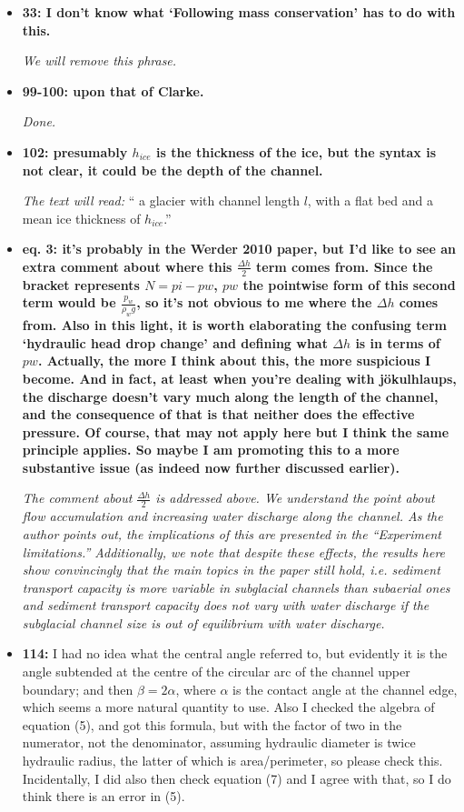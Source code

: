 \documentclass[11pt]{article}
\begin{document}
\begin{itemize}
\item \textbf{33: I don’t know what ‘Following mass conservation’ has to do with this.}

  \textit{We will remove this phrase.}
  
\item \textbf{99-100: upon that of Clarke.}

  \textit{Done.}

\item \textbf{102: presumably $h_{ice}$ is the thickness of the ice, but the syntax is not clear, it could be the depth of the channel.}

  \textit{The text will read:} `` a glacier with channel length $l$, with a flat bed and a mean ice thickness of $h_{ice}$.''
  
\item \textbf{eq. 3: it’s probably in the Werder 2010 paper, but I’d like to see an extra comment about where this $\frac{\Delta h}{2}$ term comes from.
  Since the bracket represents $N = pi-pw$, $pw$ the pointwise form of this second term would be $\frac{p_w}{\rho_wg}$, so it’s not obvious to me where the $\Delta h$ comes from.
  Also in this light, it is worth elaborating the confusing term ‘hydraulic head drop change’ and defining what $\Delta h$ is in terms of $pw$.
  Actually, the more I think about this, the more suspicious I become. And in fact, at least when you’re dealing with j\"okulhlaups, the discharge doesn’t vary much along the length of the channel, and the consequence of that is that neither does the effective pressure.
  Of course, that may not apply here but I think the same principle applies.
  So maybe I am promoting this to a more substantive issue
  (as indeed now further discussed earlier).}

  \textit{The comment about $\frac{\Delta h}{2}$ is addressed above. We understand the point about flow accumulation and increasing water discharge along the channel. As the author points out, the implications of this are presented in the ``Experiment limitations.'' Additionally, we note that despite these effects, the results here show convincingly that the main topics in the paper still hold, i.e. sediment transport capacity is more variable in subglacial channels than subaerial ones and sediment transport capacity does not vary with water discharge if the subglacial channel size is out of equilibrium with water discharge. }


\item \textbf{114:} I had no idea what the central angle referred to, but evidently it is the angle subtended at the centre of the circular arc of the channel upper boundary; and then $\beta = 2\alpha$, where $\alpha$ is the contact angle at the channel edge, which seems a more natural quantity to use. Also I checked the algebra of equation (5), and got this formula, but with the factor of two in the numerator, not the denominator, assuming hydraulic diameter is twice hydraulic radius, the latter of which is area/perimeter, so please check this. Incidentally, I did also then check equation (7) and I agree with that, so I do think there is an error in (5).


\end{itemize}
\end{document}
